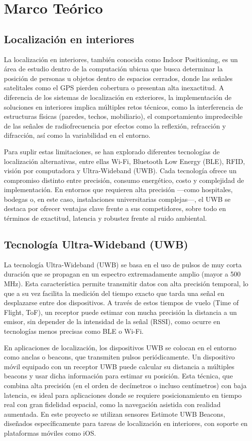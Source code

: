 \documentclass{article}
\begin{document}
\newpage
\section{Marco Teórico}
\subsection{Localización en interiores}
{\justify La localización en interiores, también conocida como Indoor Positioning, es un área de estudio dentro de la computación ubicua que busca determinar la posición de personas u objetos dentro de espacios cerrados, donde las señales satelitales como el GPS pierden cobertura o presentan alta inexactitud. A diferencia de los sistemas de localización en exteriores, la implementación de soluciones en interiores implica múltiples retos técnicos, como la interferencia de estructuras físicas (paredes, techos, mobiliario), el comportamiento impredecible de las señales de radiofrecuencia por efectos como la reflexión, refracción y difracción, así como la variabilidad en el entorno.

Para suplir estas limitaciones, se han explorado diferentes tecnologías de localización alternativas, entre ellas Wi-Fi, Bluetooth Low Energy (BLE), RFID, visión por computadora y Ultra-Wideband (UWB). Cada tecnología ofrece un compromiso distinto entre precisión, consumo energético, costo y complejidad de implementación. En entornos que requieren alta precisión —como hospitales, bodegas o, en este caso, instalaciones universitarias complejas—, el UWB se destaca por ofrecer ventajas clave frente a sus competidores, sobre todo en términos de exactitud, latencia y robustez frente al ruido ambiental.}


\subsection{Tecnología Ultra-Wideband (UWB)}
{\justify La tecnología Ultra-Wideband (UWB) se basa en el uso de pulsos de muy corta duración que se propagan en un espectro extremadamente amplio (mayor a 500 MHz). Esta característica permite transmitir datos con alta precisión temporal, lo que a su vez facilita la medición del tiempo exacto que tarda una señal en desplazarse entre dos dispositivos. A través de estos tiempos de vuelo (Time of Flight, ToF), un receptor puede estimar con mucha precisión la distancia a un emisor, sin depender de la intensidad de la señal (RSSI), como ocurre en tecnologías menos precisas como BLE o Wi-Fi.

En aplicaciones de localización, los dispositivos UWB se colocan en el entorno como anclas o beacons, que transmiten pulsos periódicamente. Un dispositivo móvil equipado con un receptor UWB puede calcular su distancia a múltiples beacons y usar dicha información para estimar su posición. Esta técnica, que combina alta precisión (en el orden de decímetros o incluso centímetros) con baja latencia, es ideal para aplicaciones donde se requiere posicionamiento en tiempo real con gran fidelidad espacial, como la navegación asistida con realidad aumentada. En este proyecto se utilizan sensores Estimote UWB Beacons, diseñados específicamente para tareas de localización en interiores, con soporte en plataformas móviles como iOS.}
\end{document}
